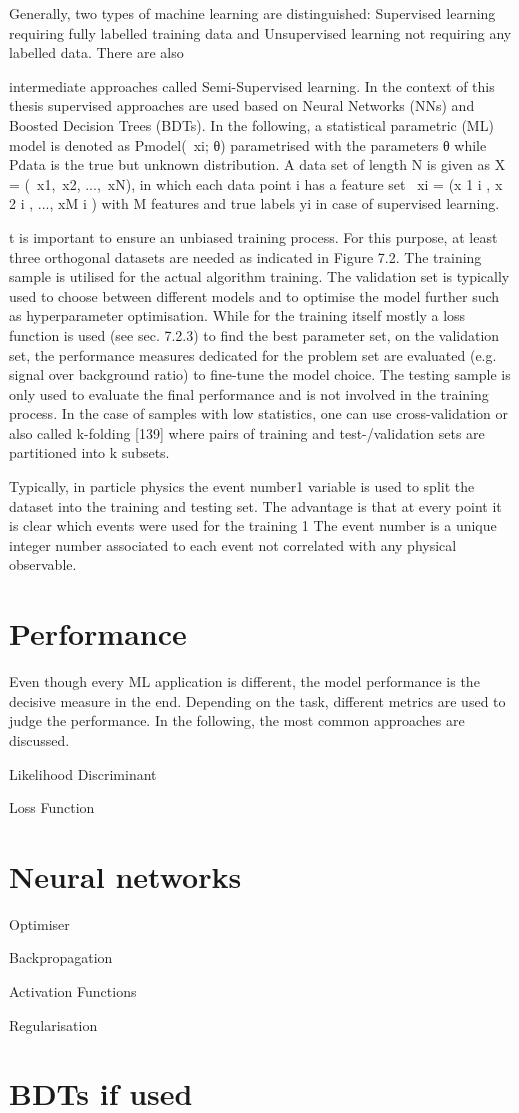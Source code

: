 Generally, two types of machine learning are distinguished: Supervised learning requiring fully
labelled training data and Unsupervised learning not requiring any labelled data. There are also

intermediate approaches called Semi-Supervised learning. In the context of this thesis supervised
approaches are used based on Neural Networks (NNs) and Boosted Decision Trees (BDTs).
In the following, a statistical parametric (ML) model is denoted as Pmodel(~xi; θ) parametrised with
the parameters θ while Pdata is the true but unknown distribution. A data set of length N is given
as X~ = (~x1,~x2, ...,~xN), in which each data point i has a feature set ~xi = (x
1
i
, x
2
i
, ..., xM
i
) with M
features and true labels yi in case of supervised learning.

t is important to ensure an unbiased training process. For this purpose, at least three orthogonal
datasets are needed as indicated in Figure 7.2. The training sample is utilised for the actual algorithm
training. The validation set is typically used to choose between different models and to optimise
the model further such as hyperparameter optimisation. While for the training itself mostly a loss
function is used (see sec. 7.2.3) to find the best parameter set, on the validation set, the performance
measures dedicated for the problem set are evaluated (e.g. signal over background ratio) to fine-tune
the model choice. The testing sample is only used to evaluate the final performance and is not involved in the training process. In the case of samples with low statistics, one can use cross-validation
or also called k-folding [139] where pairs of training and test-/validation sets are partitioned into k
subsets.

Typically, in particle physics the event number1 variable is used to split the dataset into the training
and testing set. The advantage is that at every point it is clear which events were used for the training
1 The event number is a unique integer number associated to each event not correlated with any physical observable.
\section{Performance}

Even though every ML application is different, the model performance is the decisive measure in the
end. Depending on the task, different metrics are used to judge the performance. In the following,
the most common approaches are discussed.

Likelihood Discriminant

Loss Function

\section{Neural networks}

Optimiser

Backpropagation

Activation Functions

Regularisation

\section{BDTs if used}